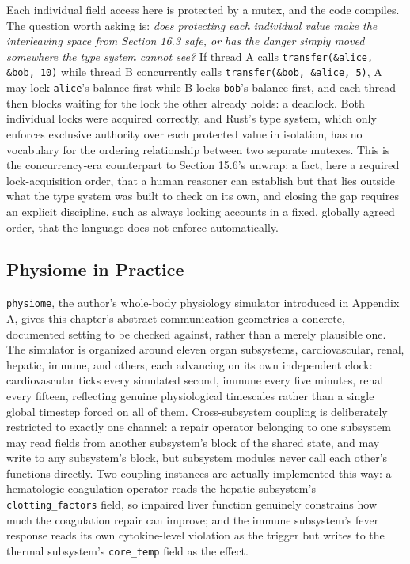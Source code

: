 \documentclass[11pt]{book}
\begin{document}
Each individual field access here is protected by a mutex, and the code compiles. The question worth asking is: \emph{does protecting each individual value make the interleaving space from Section 16.3 safe, or has the danger simply moved somewhere the type system cannot see?} If thread A calls \texttt{transfer(\&alice, \&bob, 10)} while thread B concurrently calls \texttt{transfer(\&bob, \&alice, 5)}, A may lock \texttt{alice}'s balance first while B locks \texttt{bob}'s balance first, and each thread then blocks waiting for the lock the other already holds: a deadlock. Both individual locks were acquired correctly, and Rust's type system, which only enforces exclusive authority over each protected value in isolation, has no vocabulary for the ordering relationship between two separate mutexes. This is the concurrency-era counterpart to Section 15.6's unwrap: a fact, here a required lock-acquisition order, that a human reasoner can establish but that lies outside what the type system was built to check on its own, and closing the gap requires an explicit discipline, such as always locking accounts in a fixed, globally agreed order, that the language does not enforce automatically.

\subsection*{Physiome in Practice}

\texttt{physiome}, the author's whole-body physiology simulator introduced in Appendix A, gives this chapter's abstract communication geometries a concrete, documented setting to be checked against, rather than a merely plausible one. The simulator is organized around eleven organ subsystems, cardiovascular, renal, hepatic, immune, and others, each advancing on its own independent clock: cardiovascular ticks every simulated second, immune every five minutes, renal every fifteen, reflecting genuine physiological timescales rather than a single global timestep forced on all of them. Cross-subsystem coupling is deliberately restricted to exactly one channel: a repair operator belonging to one subsystem may read fields from another subsystem's block of the shared state, and may write to any subsystem's block, but subsystem modules never call each other's functions directly. Two coupling instances are actually implemented this way: a hematologic coagulation operator reads the hepatic subsystem's \texttt{clotting\_factors} field, so impaired liver function genuinely constrains how much the coagulation repair can improve; and the immune subsystem's fever response reads its own cytokine-level violation as the trigger but writes to the thermal subsystem's \texttt{core\_temp} field as the effect.
\end{document}
